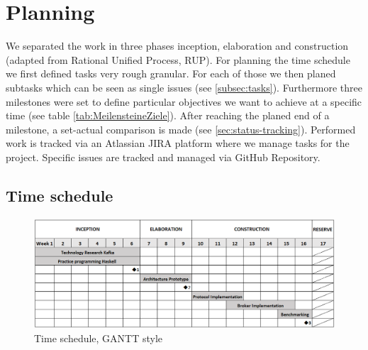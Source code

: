 
\newpage
\section*{Planning}
We separated the work in three phases inception, elaboration and construction
(adapted from Rational Unified Process, RUP). For planning the time schedule we
first defined tasks very rough granular. For each of those we then planed
subtasks which can be seen as single issues (see \ref{subsec:tasks}).
Furthermore three milestones were set to define particular objectives we want to
achieve at a specific time (see table \ref{tab:MeilensteineZiele}).  After reaching the
planed end of a milestone, a set-actual comparison is made (see
\ref{sec:status-tracking}). Performed work is
tracked via an Atlassian JIRA platform where we manage tasks for the project.
Specific issues are tracked and managed via GitHub Repository. 


\subsection{Time schedule}
\begin{figure}[H]
    \centering
    \includegraphics[width=1\textwidth]{images/workschedule.png}
    \caption{Time schedule, GANTT style}
    \label{fig:workschedule}
\end{figure}

